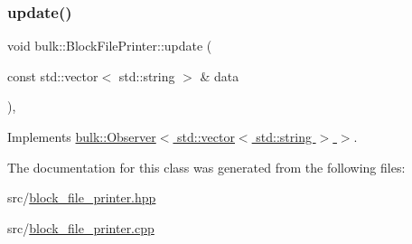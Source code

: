 \mbox{\label{classbulk_1_1BlockFilePrinter_a3e8a6eaf52ef8bef0fa9ec0b298c7382}} 
\subsubsection{\texorpdfstring{update()}{update()}}
{\footnotesize\ttfamily void bulk\+::\+Block\+File\+Printer\+::update (\begin{DoxyParamCaption}\item[{const std\+::vector$<$ std\+::string $>$ \&}]{data }\end{DoxyParamCaption})\hspace{0.3cm}{\ttfamily [override]}, {\ttfamily [virtual]}}



Implements \hyperlink{classbulk_1_1Observer_af17104660bf8b287e467213c4efbee2e}{bulk\+::\+Observer$<$ std\+::vector$<$ std\+::string $>$ $>$}.



The documentation for this class was generated from the following files\+:\begin{DoxyCompactItemize}
\item 
src/\hyperlink{block__file__printer_8hpp}{block\+\_\+file\+\_\+printer.\+hpp}\item 
src/\hyperlink{block__file__printer_8cpp}{block\+\_\+file\+\_\+printer.\+cpp}\end{DoxyCompactItemize}
